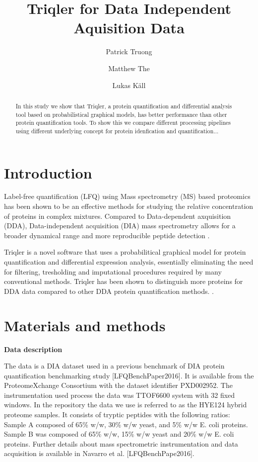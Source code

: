 \documentclass[10pt,letterpaper]{article}
\title{Triqler for Data Independent Aquisition Data}
\author{Patrick Truong \and Matthew The \and Lukas K\"{a}ll}
\begin{document}
\maketitle

\begin{abstract}
  In this study we show that Triqler, a protein quantification and differential analysis tool based on probabilistical graphical models, has better performance than other protein quantification tools. To show this we compare different processing pipelines using different underlying concept for protein idenfication and quantification... 
\end{abstract}
  

\section*{Introduction}
Label-free quantification (LFQ) using Mass spectrometry (MS) based proteomics has been shown to be an effective methods for studying the relative concentration of proteins in complex mixtures. Compared to Data-dependent axquisition (DDA), Data-independent acquisition (DIA) mass spectrometry allows for a broader dynamical range and more reproducible peptide detection 
 \cite{zhang2020DIA, Lu2021DIAmeter}.  
 
Triqler is a novel software that uses a probabilitical graphical model for protein quantification and differential expression analysis, essentially eliminating the need for filtering, tresholding and imputational procedures required by many conventional methods. Triqler has been shown to distinguish more proteins for DDA data compared to other DDA protein quantification methods. \cite{The2018Integrated}. 


\section*{Materials and methods}
\textbf{Data description}

The data is a DIA dataset used in a previous benchmark of DIA protein quantification benchmarking study [LFQBenchPaper2016]. It is available from the ProteomeXchange Consortium with the dataset identifier PXD002952. The instrumentation used process the data was TTOF6600 system with 32 fixed windows. In the repository the data we use is referred to as the HYE124 hybrid proteome samples. It consists of tryptic peptides with the following ratios: Sample A composed of 65\% w/w, 30\% w/w yeast, and 5\% w/w E. coli proteins. Sample B was composed of 65\% w/w, 15\% w/w yeast and 20\% w/w E. coli proteins. Further details about mass spectrometric instrumentation and data acquisition is available in Navarro et al. [LFQBenchPape2016].     
\end{document}
